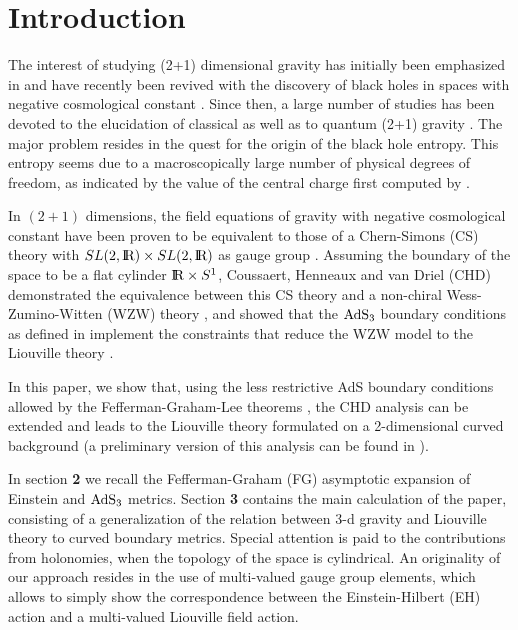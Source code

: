 \documentclass[a4paper,10pt]{article}
\begin{document}
\section{Introduction} 
 
The interest of studying (2+1) dimensional gravity has initially been  
emphasized in \cite{DJH} and have recently been revived with the discovery  
of black holes in spaces with negative cosmological constant \cite{BTZ}. 
Since then, a large number of studies has been devoted to the elucidation 
of classical as well as to quantum (2+1) gravity \cite{CAR}. The major problem 
resides in the quest for the origin of the black hole entropy. This entropy  
seems due to a macroscopically large number of physical degrees of freedom, 
as  
indicated by the value of the central charge first computed by \cite{BH}. 
 
In $(2+1)$ dimensions, the field equations of gravity 
with negative cosmological constant have been proven to be equivalent  
to those of a Chern-Simons  
(CS) theory with $SL(2,{\hbox{{\rm I}\kern-.2em\hbox{\rm R}}}) \times SL(2,{\hbox{{\rm I}\kern-.2em\hbox{\rm R}}})$ as gauge group \cite{ATW}. 
Assuming the boundary of the space to be a flat cylinder ${\hbox{{\rm I}\kern-.2em\hbox{\rm R}}} \times S^1$,  
Coussaert, Henneaux and van Driel (CHD) \cite{CHD} demonstrated  
the equivalence  
between this CS theory and a non-chiral Wess-Zumino-Witten (WZW) 
theory \cite{MS,EMSS}, and showed that the $\rm AdS_3$ boundary conditions as defined  
in \cite{BH} implement the constraints 
that reduce the WZW model to the Liouville theory \cite{FWB}. 
  
In this paper, we show that, using the less restrictive 
AdS boundary conditions allowed by the Fefferman-Graham-Lee 
theorems \cite{GL,FG}, the CHD analysis can be extended and leads 
to the Liouville theory formulated on a 2-dimensional curved background (a 
preliminary version of this analysis can be found in \cite{RS}). 

In section {\bf 2} we recall
the Fefferman-Graham (FG) asymptotic expansion of Einstein
and  $\rm AdS_3$ metrics. Section {\bf 3} contains the main calculation of
the paper, consisting of a generalization of the relation between
3-d gravity and Liouville theory to curved boundary metrics. Special attention
is paid to the contributions from holonomies, when the topology of the
space is cylindrical. An originality of our approach 
resides in the use of  multi-valued gauge group elements,
which allows to simply show
the correspondence between the Einstein-Hilbert (EH) 
action and a
multi-valued Liouville field action.
 
\end{document}
